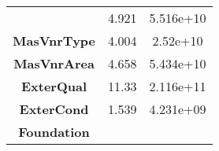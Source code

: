 \documentclass[]{article}
\begin{document}
\begin{longtable}[c]{@{}ccc@{}}
\begin{minipage}[t]{0.25\columnwidth}
\strut\end{minipage} &
\begin{minipage}[t]{0.16\columnwidth}\centering\strut
4.921
\strut\end{minipage} &
\begin{minipage}[t]{0.19\columnwidth}\centering\strut
5.516e+10
\strut\end{minipage}\tabularnewline
\begin{minipage}[t]{0.25\columnwidth}\centering\strut
\textbf{MasVnrType}
\strut\end{minipage} &
\begin{minipage}[t]{0.16\columnwidth}\centering\strut
4.004
\strut\end{minipage} &
\begin{minipage}[t]{0.19\columnwidth}\centering\strut
2.52e+10
\strut\end{minipage}\tabularnewline
\begin{minipage}[t]{0.25\columnwidth}\centering\strut
\textbf{MasVnrArea}
\strut\end{minipage} &
\begin{minipage}[t]{0.16\columnwidth}\centering\strut
4.658
\strut\end{minipage} &
\begin{minipage}[t]{0.19\columnwidth}\centering\strut
5.434e+10
\strut\end{minipage}\tabularnewline
\begin{minipage}[t]{0.25\columnwidth}\centering\strut
\textbf{ExterQual}
\strut\end{minipage} &
\begin{minipage}[t]{0.16\columnwidth}\centering\strut
11.33
\strut\end{minipage} &
\begin{minipage}[t]{0.19\columnwidth}\centering\strut
2.116e+11
\strut\end{minipage}\tabularnewline
\begin{minipage}[t]{0.25\columnwidth}\centering\strut
\textbf{ExterCond}
\strut\end{minipage} &
\begin{minipage}[t]{0.16\columnwidth}\centering\strut
1.539
\strut\end{minipage} &
\begin{minipage}[t]{0.19\columnwidth}\centering\strut
4.231e+09
\strut\end{minipage}\tabularnewline
\begin{minipage}[t]{0.25\columnwidth}\centering\strut
\textbf{Foundation}
\strut\end{minipage} &

\end{longtable}
\end{document}
